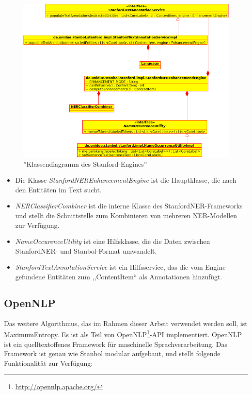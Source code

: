 \begin{figure}[ht]
\centering
\includegraphics[width=\textwidth]{Bilder/stanford-classes.png}
\caption{''Klassendiagramm  des Stanford-Engines''}
\label{fig:stanfclasses}
\end{figure}
\begin{itemize}
\item Die Klasse \textit{StanfordNEREnhancementEngine} ist die Hauptklasse, die nach den Entitäten im Text sucht.
\item \textit{NERClassifierCombiner} ist die interne Klasse des StanfordNER-Frameworks und stellt die Schnittstelle zum Kombinieren von mehreren NER-Modellen zur Verfügung.
\item \textit{NameOccurenceUtility} ist eine Hilfsklasse, die die Daten zwischen StanfordNER- und Stanbol-Format umwandelt.
\item \textit{StanfordTextAnnotationService} ist ein Hilfsservice, das die vom Engine gefundene Entitäten	zum ,,ContentItem`` als Annotationen hinzufügt.
\end{itemize}

\subsection{OpenNLP}
Das weitere Algorithmus, das im Rahmen dieser Arbeit verwendet werden soll, ist MaximumEntropy. Es ist als Teil von OpenNLP\footnote{\url{http://opennlp.apache.org/}}-API implementiert. OpenNLP ist ein quelltextoffenes Framework für maschinelle Sprachverarbeitung. Das Framework ist genau wie Stanbol modular aufgebaut, und stellt folgende Funktionalität zur Verfügung:

